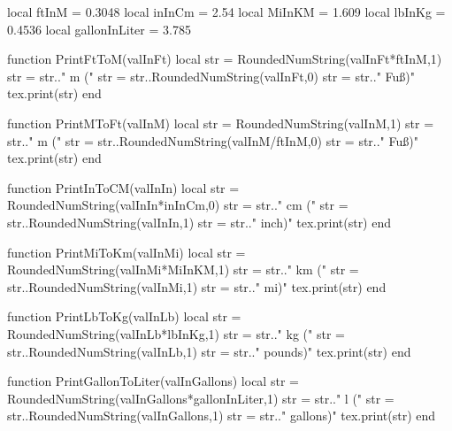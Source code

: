 \begin{luacode}
	local ftInM = 0.3048
	local inInCm = 2.54
	local MiInKM = 1.609
	local lbInKg = 0.4536
	local gallonInLiter = 3.785
	
	function PrintFtToM(valInFt)
		local str = RoundedNumString(valInFt*ftInM,1)
		str = str.." m ("
		str = str..RoundedNumString(valInFt,0)
		str = str.." Fuß)"
		tex.print(str)
	end
	
	function PrintMToFt(valInM)
		local str = RoundedNumString(valInM,1)
		str = str.." m ("
		str = str..RoundedNumString(valInM/ftInM,0)
		str = str.." Fuß)"
		tex.print(str)
	end

	function PrintInToCM(valInIn)
		local str = RoundedNumString(valInIn*inInCm,0)
		str = str.." cm ("
		str = str..RoundedNumString(valInIn,1)
		str = str.." inch)"
		tex.print(str)
	end

	function PrintMiToKm(valInMi)
		local str = RoundedNumString(valInMi*MiInKM,1)
		str = str.." km ("
		str = str..RoundedNumString(valInMi,1)
		str = str.." mi)"
		tex.print(str)
	end

	function PrintLbToKg(valInLb)
		local str = RoundedNumString(valInLb*lbInKg,1)
		str = str.." kg ("
		str = str..RoundedNumString(valInLb,1)
		str = str.." pounds)"
		tex.print(str)
	end

	function PrintGallonToLiter(valInGallons)
		local str = RoundedNumString(valInGallons*gallonInLiter,1)
		str = str.." l ("
		str = str..RoundedNumString(valInGallons,1)
		str = str.." gallons)"
		tex.print(str)
	end
\end{luacode}

\newcommand{\ft}[1]{
	\directlua{PrintFtToM(#1)}
}

\newcommand{\metre}[1]{
	\directlua{PrintMToFt(#1)}
}

\newcommand{\inch}[1]{
	\directlua{PrintInToCM(#1)}
}

\newcommand{\mile}[1]{
	\directlua{PrintMiToKm(#1)}
}

\newcommand{\lb}[1]{
	\directlua{PrintLbToKg(#1)}
}

\newcommand{\gallon}[1]{
	\directlua{PrintGallonToLiter(#1)}
}
